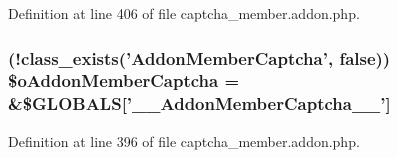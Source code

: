 Definition at line 406 of file captcha\+\_\+member.\+addon.\+php.

\hypertarget{captcha__member_8addon_8php_a31cda8178bc3156a0f1ea23c851844dd}{
\subsubsection[{\$o\+Addon\+Member\+Captcha}]{ (!class\+\_\+exists('Addon\+Member\+Captcha', false)) \$o\+Addon\+Member\+Captcha = \&\$G\+L\+O\+B\+A\+L\+S\mbox{[}'\+\_\+\+\_\+\+Addon\+Member\+Captcha\+\_\+\+\_\+'\mbox{]}}}\label{captcha__member_8addon_8php_a31cda8178bc3156a0f1ea23c851844dd}


Definition at line 396 of file captcha\+\_\+member.\+addon.\+php.

